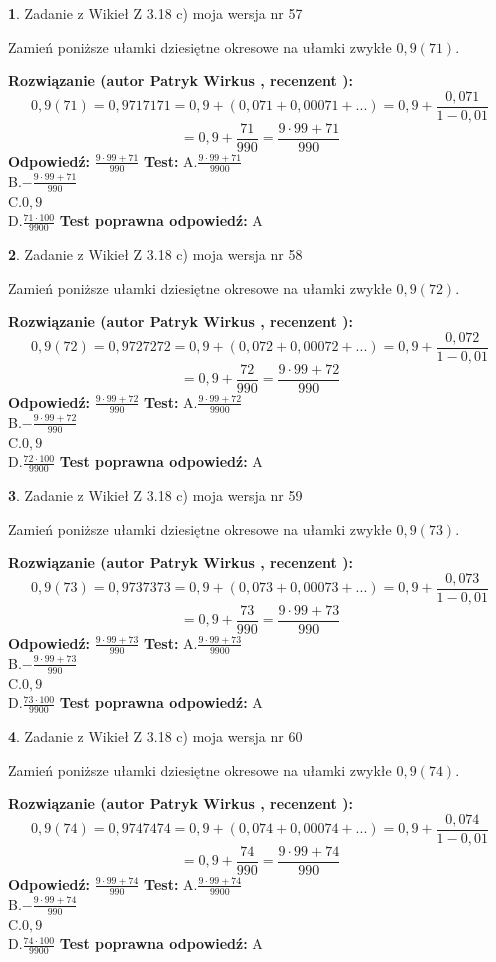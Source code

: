 \documentclass[12pt, a4paper]{article}
\theoremstyle{definition} %
\newtheorem{zad}{}
\newcommand{\zadStart}[1]{\begin{zad}#1\newline}
\newcommand{\zadStop}{\end{zad}}
\newcommand{\rozwStart}[2]{\noindent \textbf{Rozwiązanie (autor #1 , recenzent #2): }\newline}
\newcommand{\rozwStop}{\newline}
\newcommand{\odpStart}{\noindent \textbf{Odpowiedź:}\newline}
\newcommand{\odpStop}{\newline}
\newcommand{\testStart}{\noindent \textbf{Test:}\newline}
\newcommand{\testStop}{\newline}
\newcommand{\kluczStart}{\noindent \textbf{Test poprawna odpowiedź:}\newline}
\newcommand{\kluczStop}{\newline}
\begin{document}
\zadStart{Zadanie z Wikieł Z 3.18 c) moja wersja nr 57}

Zamień poniższe ułamki dziesiętne okresowe na ułamki zwykłe $0,9(71)$.
\zadStop
\rozwStart{Patryk Wirkus}{}
$$0,9(71)=0,9717171=0,9+(0,071+0,00071+...)=0,9+\frac{0,071}{1-0,01}$$
$$=0,9+\frac{71}{990}=\frac{9\cdot99+71}{990}$$
\rozwStop
\odpStart
$\frac{9\cdot99+71}{990}$
\odpStop
\testStart
A.$\frac{9\cdot99+71}{9900}$\\ B.$-\frac{9\cdot99+71}{990}$\\ C.$0,9$\\ D.$\frac{71\cdot100}{9900}$
\testStop
\kluczStart
A
\kluczStop



\zadStart{Zadanie z Wikieł Z 3.18 c) moja wersja nr 58}

Zamień poniższe ułamki dziesiętne okresowe na ułamki zwykłe $0,9(72)$.
\zadStop
\rozwStart{Patryk Wirkus}{}
$$0,9(72)=0,9727272=0,9+(0,072+0,00072+...)=0,9+\frac{0,072}{1-0,01}$$
$$=0,9+\frac{72}{990}=\frac{9\cdot99+72}{990}$$
\rozwStop
\odpStart
$\frac{9\cdot99+72}{990}$
\odpStop
\testStart
A.$\frac{9\cdot99+72}{9900}$\\ B.$-\frac{9\cdot99+72}{990}$\\ C.$0,9$\\ D.$\frac{72\cdot100}{9900}$
\testStop
\kluczStart
A
\kluczStop



\zadStart{Zadanie z Wikieł Z 3.18 c) moja wersja nr 59}

Zamień poniższe ułamki dziesiętne okresowe na ułamki zwykłe $0,9(73)$.
\zadStop
\rozwStart{Patryk Wirkus}{}
$$0,9(73)=0,9737373=0,9+(0,073+0,00073+...)=0,9+\frac{0,073}{1-0,01}$$
$$=0,9+\frac{73}{990}=\frac{9\cdot99+73}{990}$$
\rozwStop
\odpStart
$\frac{9\cdot99+73}{990}$
\odpStop
\testStart
A.$\frac{9\cdot99+73}{9900}$\\ B.$-\frac{9\cdot99+73}{990}$\\ C.$0,9$\\ D.$\frac{73\cdot100}{9900}$
\testStop
\kluczStart
A
\kluczStop



\zadStart{Zadanie z Wikieł Z 3.18 c) moja wersja nr 60}

Zamień poniższe ułamki dziesiętne okresowe na ułamki zwykłe $0,9(74)$.
\zadStop
\rozwStart{Patryk Wirkus}{}
$$0,9(74)=0,9747474=0,9+(0,074+0,00074+...)=0,9+\frac{0,074}{1-0,01}$$
$$=0,9+\frac{74}{990}=\frac{9\cdot99+74}{990}$$
\rozwStop
\odpStart
$\frac{9\cdot99+74}{990}$
\odpStop
\testStart
A.$\frac{9\cdot99+74}{9900}$\\ B.$-\frac{9\cdot99+74}{990}$\\ C.$0,9$\\ D.$\frac{74\cdot100}{9900}$
\testStop
\kluczStart
A
\kluczStop
\end{document}
